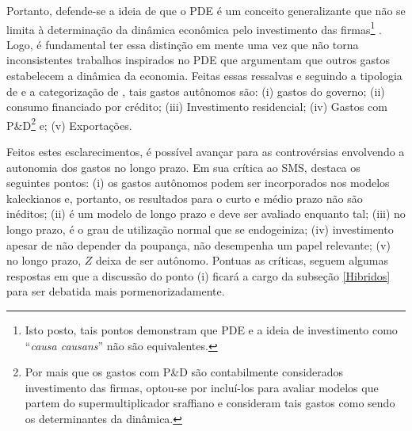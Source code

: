 Portanto, defende-se a ideia de que o PDE é um conceito generalizante que não se limita à determinação da dinâmica econômica pelo investimento das firmas\footnote{
	Isto posto, tais pontos demonstram que PDE e a ideia de investimento como ``\textit{causa causans}'' não são equivalentes.}
\cite{brochier_macroeconomics_2017}. 
Logo, é fundamental ter essa distinção em mente uma vez que não torna inconsistentes trabalhos inspirados no PDE que argumentam que  outros gastos estabelecem a dinâmica da economia.
Feitas essas ressalvas e seguindo a tipologia de \textcite{cesaratto_technical_2003} e a categorização de \textcite{serrano_sraffian_1995}, tais gastos autônomos são: (i) gastos do governo; (ii) consumo financiado por crédito; (iii) Investimento residencial; (iv) Gastos com P\&D\footnote{
	Por mais que os gastos com P\&D são contabilmente considerados investimento das firmas, optou-se por incluí-los para avaliar modelos que partem do supermultiplicador sraffiano e consideram tais gastos como sendo os determinantes da dinâmica.
} e; (v) Exportações.

Feitos estes esclarecimentos, é possível avançar para as controvérsias envolvendo a autonomia dos gastos no longo prazo. 
Em sua crítica ao SMS, \textcite{nikiforos_comments_2018} destaca os seguintes pontos: 
(i) os gastos autônomos podem ser incorporados nos modelos kaleckianos e, portanto, os resultados para o curto e médio prazo não são inéditos; 
(ii) é um modelo de longo prazo e deve ser avaliado enquanto tal; 
(iii) no longo prazo, é o grau de utilização normal que se endogeiniza; 
(iv) investimento apesar de não depender da poupança, não desempenha um papel relevante; 
(v) no longo prazo, $Z$ deixa de ser autônomo.  
Pontuas as críticas, seguem algumas respostas em que a discussão do ponto (i) ficará a cargo da subseção \ref{Hibridos} para ser debatida mais pormenorizadamente.

